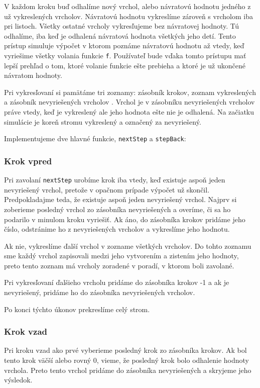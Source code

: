 V každom kroku buď odhalíme nový vrchol, alebo návratovú hodnotu jedného
z už vykreslených vrcholov. Návratovú hodnotu vykreslíme zároveň s vrcholom iba pri listoch.
Všetky ostatné vrcholy vykresľujeme bez návratovej hodnoty. Tú odhalíme, iba keď
je odhalená návratová hodnota všetkých jeho detí. Tento prístup simuluje výpočet v ktorom
poznáme návratovú hodnotu až vtedy, keď vyriešime všetky volania funkcie \lstinline[language=Javascript]{f}.
Používateľ bude vďaka tomto prístupu mať lepší prehľad o tom, ktoré volanie funkcie ešte prebieha
a ktoré je už ukončené návratom hodnoty.

Pri vykresľovaní si pamätáme tri zoznamy: zásobník krokov, zoznam vykreslených a zásobník
nevyriešených vrcholov . Vrchol je v zásobníku nevyriešených vrcholov práve vtedy,
keď je vykreslený ale jeho hodnota ešte nie je odhalená. Na začiatku simulácie je
koreň stromu vykreslený a označený za nevyriešený.

Implementujeme dve hlavné funkcie, \lstinline[language=Javascript]{nextStep} a
\lstinline[language=Javascript]{stepBack}:
\subsubsection{Krok vpred}
Pri zavolaní \lstinline[language=Javascript]{nextStep} urobíme krok iba vtedy,
keď existuje aspoň jeden nevyriešený vrchol, pretože v opačnom prípade výpočet už skončil.
Predpokladajme teda, že existuje aspoň jeden nevyriešený vrchol. Najprv si zoberieme
posledný vrchol zo zásobníka nevyriešených a overíme, či sa ho podarilo v minulom kroku vyriešiť.
Ak áno, do zásobníka krokov pridáme jeho číslo, odstránime ho z nevyriešených vrcholov a
vykreslíme jeho hodnotu.

Ak nie, vykreslíme ďalší vrchol v zozname všetkých vrcholov. Do tohto zoznamu sme
každý vrchol zapisovali medzi jeho vytvorením a zistením jeho hodnoty, preto
tento zoznam má vrcholy zoradené v poradí, v ktorom boli zavolané.

Pri vykresľovaní ďalšieho vrcholu pridáme do zásobníka krokov -1 a ak je nevyriešený,
pridáme ho do zásobníka nevyriešených vrcholov.

Po konci týchto úkonov prekreslíme celý strom.
\subsubsection{Krok vzad}
Pri kroku vzad ako prvé vyberieme posledný krok zo zásobníka krokov. Ak bol tento
krok väčší alebo rovný 0, vieme, že posledný krok bolo odhalenie hodnoty vrchola.
Preto tento vrchol pridáme do zásobníka nevyriešených a skryjeme jeho výsledok.

